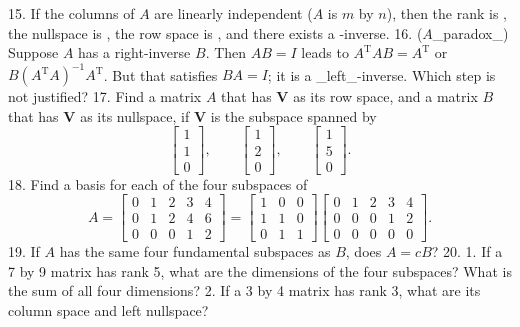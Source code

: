 15. If the columns of \(A\) are linearly independent (\(A\) is \(m\) by \(n\)), then the rank is , the nullspace is , the row space is , and there exists a -inverse.
16. (\(A\)_paradox_) Suppose \(A\) has a right-inverse \(B\). Then \(AB=I\) leads to \(A^{\mathrm{T}}AB=A^{\mathrm{T}}\) or \(B(A^{\mathrm{T}}A)^{-1}A^{\mathrm{T}}\). But that satisfies \(BA=I\); it is a _left_-inverse. Which step is not justified?
17. Find a matrix \(A\) that has \(\mathbf{V}\) as its row space, and a matrix \(B\) that has \(\mathbf{V}\) as its nullspace, if \(\mathbf{V}\) is the subspace spanned by \[\begin{bmatrix}1\\ 1\\ 0\end{bmatrix},\qquad\begin{bmatrix}1\\ 2\\ 0\end{bmatrix},\qquad\begin{bmatrix}1\\ 5\\ 0\end{bmatrix}.\]
18. Find a basis for each of the four subspaces of \[A=\begin{bmatrix}0&1&2&3&4\\ 0&1&2&4&6\\ 0&0&0&1&2\end{bmatrix}=\begin{bmatrix}1&0&0\\ 1&1&0\\ 0&1&1\end{bmatrix}\begin{bmatrix}0&1&2&3&4\\ 0&0&0&1&2\\ 0&0&0&0&0\end{bmatrix}.\]
19. If \(A\) has the same four fundamental subspaces as \(B\), does \(A=cB\)?
20. 1. If a 7 by 9 matrix has rank 5, what are the dimensions of the four subspaces? What is the sum of all four dimensions? 2. If a 3 by 4 matrix has rank 3, what are its column space and left nullspace?
